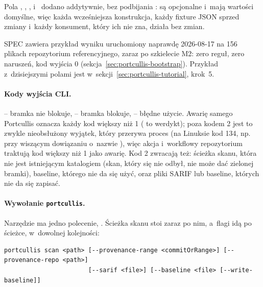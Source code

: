 Pola , , , 
i~ dodano addytywnie, bez podbijania : są
opcjonalne i~mają wartości domyślne, więc każda wcześniejsza konstrukcja, każdy fixture
JSON sprzed zmiany i~każdy konsument, który ich nie zna, działa bez zmian.

SPEC zawiera przykład wyniku uruchomiony naprawdę 2026-08-17 na 156 plikach repozytorium
referencyjnego, zaraz po szkielecie M2: zero reguł, zero naruszeń, kod wyjścia 0
(sekcja~\ref{sec:portcullis-bootstrap}). Przykład z~dzisiejszymi polami jest
w~sekcji~\ref{sec:portcullis-tutorial}, krok~5.

\paragraph{Kody wyjścia CLI.}  -- bramka nie blokuje,  -- bramka
blokuje,  -- błędne użycie. Awarię samego Portcullis oznacza każdy kod większy
niż 1 ( to werdykt); poza kodem 2 jest to zwykle nieobsłużony wyjątek, który przerywa
proces (na Linuksie kod 134, np. przy wiszącym dowiązaniu o~nazwie ), więc
akcja i~workflowy repozytorium traktują kod większy niż 1 jako awarię. Kod 2 zwracają też:
ścieżka skanu, która nie jest
istniejącym katalogiem (skan, który się nie odbył, nie może dać zielonej bramki), baseline,
którego nie da się użyć, oraz pliki SARIF lub baseline, których nie da się zapisać.

\paragraph{Wywołanie \texttt{portcullis}.} Narzędzie ma jedno polecenie, .
Ścieżka skanu stoi zaraz po nim, a~flagi idą po ścieżce, w~dowolnej kolejności:

\begin{lstlisting}
portcullis scan <path> [--provenance-range <commitOrRange>] [--provenance-repo <path>]
                       [--sarif <file>] [--baseline <file> [--write-baseline]]
\end{lstlisting}

